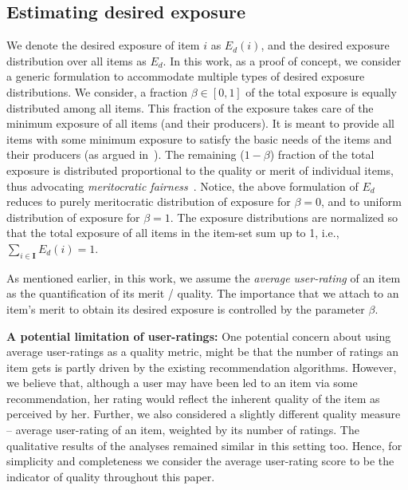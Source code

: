 \subsection{Estimating desired exposure}
We denote the desired exposure of item $i$ as $E_d(i)$, and the desired exposure distribution over all items as $E_d$.
In this work, as a proof of concept, we consider a generic formulation to accommodate multiple types of desired exposure distributions. We consider, a fraction $\beta \in [0, 1]$ of the total exposure is equally distributed among all items. This fraction of the exposure takes care of the minimum exposure of all items (and their producers). It is meant to provide all items with some minimum exposure to satisfy the basic needs of the items and their producers (as argued in~\cite{patro2020incremental}). The remaining ($1-\beta$) fraction of the total exposure is distributed proportional to the quality or merit of individual items, thus advocating \textit{meritocratic fairness}~\cite{joseph2018meritocratic,joseph2016fairness}. Notice, the above formulation of $E_d$ reduces to purely meritocratic distribution of exposure for $\beta = 0$, and to uniform distribution of exposure for $\beta = 1$. The exposure distributions are normalized so that the total exposure of all items in the item-set sum up to 1, i.e., $\sum_{i \in \mathbf{I}}^{}{E_d(i)} = 1$. 


As mentioned earlier, in this work, we assume the {\it average user-rating} of an item as the quantification of its merit / quality. The importance that we attach to an item's merit to obtain its desired exposure is controlled by the parameter $\beta$.


\vspace{1mm}
\noindent
{\bf A potential limitation of user-ratings:} One potential concern about using average user-ratings as a quality metric, might be that the number of ratings an item gets is partly driven by the %
existing recommendation algorithms. 
However, we believe that, although a user may have been led to an item via some recommendation, her rating would reflect the inherent quality of the item as perceived by her. 
Further, we also considered a slightly different quality measure -- average user-rating of an item, weighted by its number of ratings. The qualitative results of the analyses remained similar
in this setting too. %
Hence, for simplicity and completeness we 
consider the average user-rating score to be the indicator of quality throughout this paper. 

